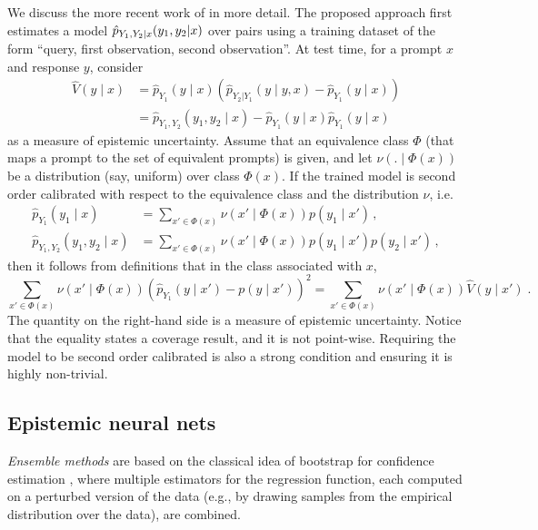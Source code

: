 We discuss the more recent work of \citet{johnson2024experts} in more detail. The proposed approach first estimates a model $\hat{p}_{Y_1,Y_2|x}(y_1,y_2|x)$ over pairs using a training dataset of the form ``query, first observation, second observation''. 
At test time, for a prompt $x$ and response $y$, \citet{johnson2024experts} consider 
\begin{align*}
\hat{V}(y\mid x) &= \hat{p}_{Y_1}(y\mid x) \left( \hat{p}_{Y_2|Y_1}(y\mid y,x) - \hat{p}_{Y_1}(y\mid x) \right) \\
&= \hat{p}_{Y_1,Y_2}(y_1,y_2\mid x) - \hat{p}_{Y_1}(y\mid x) \hat{p}_{Y_1}(y\mid x) 
\end{align*}
as a measure of epistemic uncertainty. Assume that an equivalence class $\Phi$ (that maps a prompt to the set of equivalent prompts) is given, and let $\nu(.\mid \Phi(x))$ be a distribution (say, uniform) over class $\Phi(x)$. If the trained model is second order calibrated with respect to the equivalence class and the distribution $\nu$, i.e. 
\begin{align*}
\hat{p}_{Y_1}(y_1\mid x) &= \sum_{x'\in \Phi(x)} \nu(x'\mid \Phi(x))  p(y_1\mid x')\,,\\
\hat{p}_{Y_1,Y_2}(y_1,y_2\mid x) &= \sum_{x'\in \Phi(x)} \nu(x'\mid \Phi(x))  p(y_1\mid x') p(y_2\mid x')\,,
\end{align*}
then it follows from definitions that in the class associated with $x$,
\[
\sum_{x'\in \Phi(x)} \nu(x'\mid \Phi(x)) (\hat{p}_{Y_1} (y\mid x') - p(y\mid x'))^2  = \sum_{x'\in \Phi(x)} \nu(x'\mid \Phi(x)) \hat{V}(y\mid x') \;.
\]
The quantity on the right-hand side is a measure of epistemic uncertainty. Notice that the equality states a coverage result, and it is not point-wise. Requiring the model to be second order calibrated is also a strong condition and ensuring it is highly non-trivial. 


\subsection{Epistemic neural nets}
%
\emph{Ensemble methods} are based on the classical idea of bootstrap for confidence estimation \citep{tibshirani1993introduction}, where multiple estimators for the regression function, each computed on a perturbed version of the data (e.g., by drawing samples from the empirical distribution over the data), are combined.

